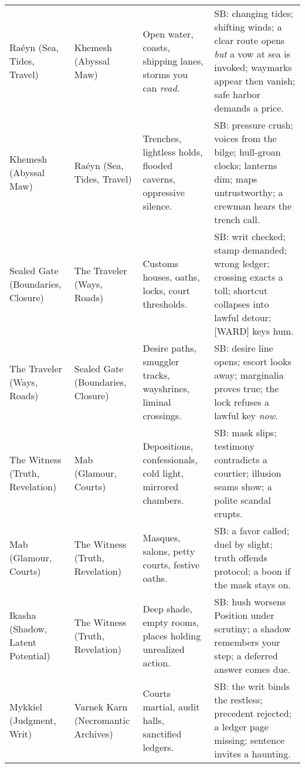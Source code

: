\begin{longtable}{@{}p{3.3cm}p{3.3cm}p{4.6cm}p{7.2cm}@{}}
  
  Raéyn (Sea, Tides, Travel) & Khemesh (Abyssal Maw) &
  Open water, coasts, shipping lanes, storms you can \emph{read}. &
  SB: changing tides; shifting winds; a clear route opens \emph{but} a vow at sea is invoked; waymarks appear then vanish; safe harbor demands a price. \\
  
  Khemesh (Abyssal Maw) & Raéyn (Sea, Tides, Travel) &
  Trenches, lightless holds, flooded caverns, oppressive silence. &
  SB: pressure crush; voices from the bilge; hull-groan clocks; lanterns dim; maps untrustworthy; a crewman hears the trench call. \\
  
  Sealed Gate (Boundaries, Closure) & The Traveler (Ways, Roads) &
  Customs houses, oaths, locks, court thresholds. &
  SB: writ checked; stamp demanded; wrong ledger; crossing exacts a toll; shortcut collapses into lawful detour; [WARD] keys hum. \\
  
  The Traveler (Ways, Roads) & Sealed Gate (Boundaries, Closure) &
  Desire paths, smuggler tracks, wayshrines, liminal crossings. &
  SB: desire line opens; escort looks away; marginalia proves true; the lock refuses a lawful key \emph{now}. \\
  
  The Witness (Truth, Revelation) & Mab (Glamour, Courts) &
  Depositions, confessionals, cold light, mirrored chambers. &
  SB: mask slips; testimony contradicts a courtier; illusion seams show; a polite scandal erupts. \\
  
  Mab (Glamour, Courts) & The Witness (Truth, Revelation) &
  Masques, salons, petty courts, festive oaths. &
  SB: a favor called; duel by slight; truth offends protocol; a boon if the mask stays on. \\
  
  Ikasha (Shadow, Latent Potential) & The Witness (Truth, Revelation) &
  Deep shade, empty rooms, places holding unrealized action. &
  SB: hush worsens Position under scrutiny; a shadow remembers your step; a deferred answer comes due. \\
  
  Mykkiel (Judgment, Writ) & Varnek Karn (Necromantic Archives) &
  Courts martial, audit halls, sanctified ledgers. &
  SB: the writ binds the restless; precedent rejected; a ledger page missing; sentence invites a haunting. \\
  

\end{longtable}
